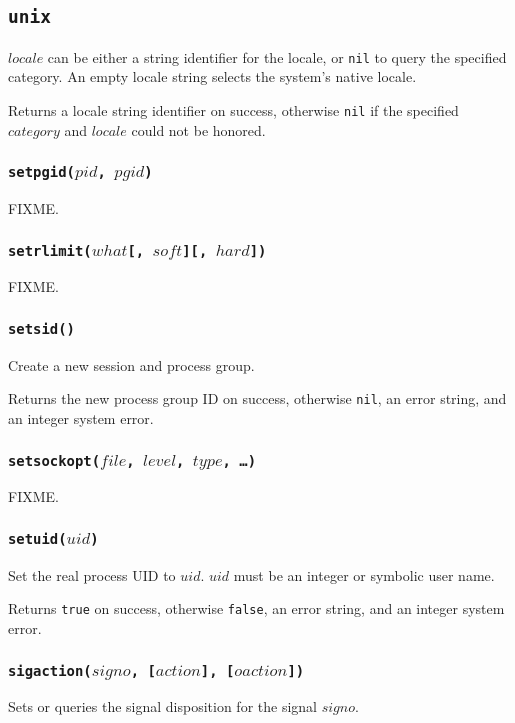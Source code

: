 \documentclass[11pt, oneside]{memoir}
\newcommand*{\true}[0]{\texttt{true}\xspace}
\newcommand*{\false}[0]{\texttt{false}\xspace}
\newcommand*{\nil}[0]{\texttt{nil}\xspace}
\newcommand*{\fn}[1]{\texttt{#1}\xspace}
\newcounter{toccols}
\newenvironment{Module}[1]{
	\subsection{\texttt{#1}}
	\addtocontents{toc}{
		\protect\begin{multicols}{\value{toccols}}
	}
}{
	\addtocontents{toc}{\protect\end{multicols}}
}
\begin{document}
\begin{Module}{unix}
$locale$ can be either a string identifier for the locale, or \nil to query the specified category. An empty locale string selects the system's native locale.

Returns a locale string identifier on success, otherwise \nil if the specified $category$ and $locale$ could not be honored.

\subsubsection[\fn{setpgid}]{\fn{setpgid($pid$, $pgid$)}}

FIXME.

\subsubsection[\fn{setrlimit}]{\fn{setrlimit($what$[, $soft$][, $hard$])}}

FIXME.

\subsubsection[\fn{setsid}]{\fn{setsid()}}

Create a new session and process group.

Returns the new process group ID on success, otherwise \nil, an error string, and an integer system error.

\subsubsection[\fn{setsockopt}]{\fn{setsockopt($file$, $level$, $type$, \ldots)}}

FIXME.

\subsubsection[\fn{setuid}]{\fn{setuid($uid$)}}

Set the real process UID to $uid$. $uid$ must be an integer or symbolic user name.

Returns \true on success, otherwise \false, an error string, and an integer system error.

\subsubsection[\fn{sigaction}]{\fn{sigaction($signo$, [$action$], [$oaction$])}}

Sets or queries the signal disposition for the signal $signo$.


\end{Module}
\end{document}
